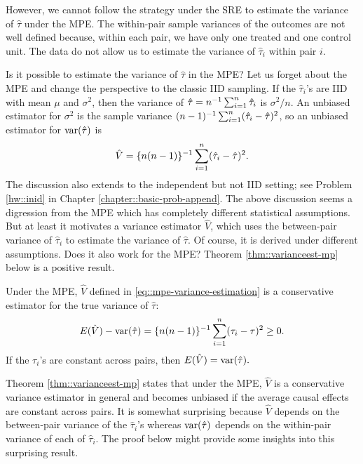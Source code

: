 However, we cannot follow the strategy under the SRE to estimate the variance of $\hat{\tau}  $ under the MPE. The within-pair sample variances of the outcomes are not well defined because, within each pair, we have only one treated and one control unit. The data do not allow us to estimate the variance of $\hat{\tau}_i $ within pair $i$.  


Is it possible to estimate the variance of $\hat{\tau}$ in the MPE? Let us forget about the MPE and change the perspective to the classic IID sampling. If the $\hat{\tau}_i$'s are IID with mean $\mu$ and $\sigma^2$, then the variance of $\hat{\tau} = n^{-1} \sum_{i=1}^n \hat{\tau}_i$ is $\sigma^2 / n$. An unbiased estimator for $\sigma^2$ is the sample variance $(n-1)^{-1} \sum_{i=1}^n ( \hat{\tau}_i -  \hat{\tau} )^2$, so an unbiased estimator for $\textup{var}( \hat{\tau}  )$ is 
\begin{equation}\label{eq::mpe-variance-estimation}
\hat{V} = \{ n(n-1)  \}^{-1} \sumn ( \hat{\tau}_i -  \hat{\tau} )^2.
\end{equation}
The discussion also extends to the independent but not IID setting; see Problem \ref{hw::inid} in Chapter \ref{chapter::basic-prob-append}.
The above discussion seems a digression from the MPE which has completely different statistical assumptions. But at least it motivates a variance estimator $\hat{V} $, which uses the between-pair variance of $\hat{\tau}_i $ to estimate the variance of $\hat{\tau}  $.  Of course, it is derived under different assumptions. Does it also work for the MPE? Theorem \ref{thm::varianceest-mp} below is a positive result.
 
\begin{theorem}\label{thm::varianceest-mp}
Under the MPE, $\hat{V}$ defined in \eqref{eq::mpe-variance-estimation} is a conservative estimator for the true variance of $\hat{\tau}  $:
$$
E(  \hat{V}) - \textup{var}(   \hat{\tau}  ) = \{ n(n-1)  \}^{-1} \sum_{i=1}^n  (\tau_i - \tau)^2 \geq 0  .
$$
If the $\tau_i$'s are constant across pairs, then $E(  \hat{V} )  = \textup{var}(\hat{\tau}) .$
\end{theorem}


Theorem \ref{thm::varianceest-mp} states that under the MPE, $\hat{V} $ is a conservative variance estimator in general and becomes unbiased if the average causal effects are constant across pairs. It is somewhat surprising because $\hat{V} $ depends on the between-pair variance of the $ \hat{\tau}_i $'s whereas $ \textup{var}(   \hat{\tau}  ) $ depends on the within-pair variance of each of $ \hat{\tau}_i $. The proof below might provide some insights into this surprising result. 
 
